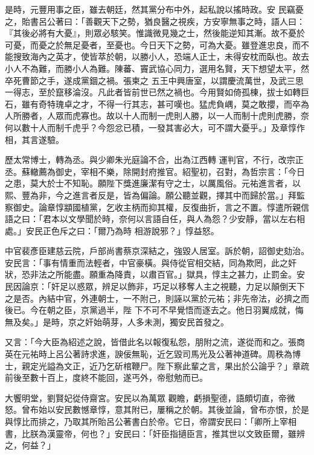 \begin{pinyinscope}
 是時，元豐用事之臣，雖去朝廷，然其黨分布中外，起私說以搖時政。安
 民竊憂之，貽書呂公著曰：「善觀天下之勢，猶良醫之視疾，方安寧無事之時，語人曰：『其後必將有大憂』，則眾必駭笑。惟識微見幾之士，然後能逆知其漸。故不憂於可憂，而憂之於無足憂者，至憂也。今日天下之勢，可為大憂。雖登進忠良，而不能搜致海內之英才，使皆萃於朝，以勝小人，恐端人正士，未得安枕而臥也。故去小人不為難，而勝小人為難。陳蕃、竇武協心同力，選用名賢，天下想望太平，然卒死曹節之手，遂成黨錮之禍。張柬之
 五王中興唐室，以謂慶流萬世，及武三思一得志，至於竄移淪沒。凡此者皆前世已然之禍也。今用賢如倚孤棟，拔士如轉巨石，雖有奇特瑰卓之才，不得一行其志，甚可嘆也。猛虎負嵎，莫之敢攖，而卒為人所勝者，人眾而虎寡也。故以十人而制一虎則人勝，以一人而制十虎則虎勝，奈何以數十人而制千虎乎？今怨忿已積，一發其害必大，可不謂大憂乎。」及章惇作相，其言遂驗。



 歷太常博士，轉為丞。與少卿朱光庭論不合，出為江西轉
 運判官，不行，改宗正丞。蘇轍薦為御史，宰相不樂，除開封府推官。紹聖初，召對，為哲宗言：「今日之患，莫大於士不知恥。願陛下獎進廉潔有守之士，以厲風俗。元祐進言者，以熙、豐為非，今之進言者反是，皆為偏論。願公聽並觀，擇其中而歸於當。」拜監察御史。論章惇顓國植黨，乞收主柄而抑其權，反復曲折，言之不置。惇遣所親信語之曰：「君本以文學聞於時，奈何以言語自任，與人為怨？少安靜，當以左右相處。」安民正色斥之曰：「爾乃為時
 相游說邪？」惇益怒。



 中官裴彥臣建慈云院，戶部尚書蔡京深結之，強毀人居室。訴於朝，詔御史劾治。安民言：「事有情重而法輕者，中官豪橫。與侍從官相交結，同為欺罔，此之奸狀，恐非法之所能盡。願重為降責，以肅百官。」獄具，惇主之甚力，止罰金。安民因論京：「奸足以惑眾，辨足以飾非，巧足以移奪人主之視聽，力足以顛倒天下之是否。內結中官，外連朝士，一不附己，則誣以黨於元祐；非先帝法，必擠之而後已。今在朝之臣，京黨過半，陛
 下不可不早覺悟而逐去之。他日羽翼成就，悔無及矣。」是時，京之奸始萌芽，人多未測，獨安民首發之。



 又言：「今大臣為紹述之說，皆借此名以報復私怨，朋附之流，遂從而和之。張商英在元祐時上呂公著詩求進，諛佞無恥，近乞毀司馬光及公著神道碑。周秩為博士，親定光謚為文正，近乃乞斫棺鞭尸。陛下察此輩之言，果出於公論乎？」章疏前後至數十百上，度終不能回，遂丐外，帝慰勉而已。



 大饗明堂，劉賢妃從侍齋宮。安民以為萬眾
 觀瞻，虧損聖德，語頗切直，帝微怒。曾布始以安民數憾章惇，意其附已，屢稱之於朝。其後並論，曾布亦恨，於是與惇比而排之，乃取其所貽呂公著書白於帝。它日，帝謂安民曰：「卿所上宰相書，比朕為漢靈帝，何也？」安民曰：「奸臣指擿臣言，推其世以文致臣爾，雖辨之，何益？」




\end{pinyinscope}
